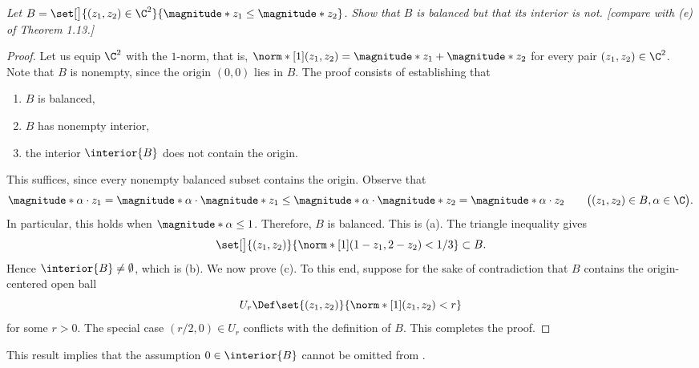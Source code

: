 % 
%
\textit{Let $B = \set[\big]{(z_1, z_2) \in \C^2}{\magnitude*{z_1} \leq \magnitude*{z_2}}$. Show that $B$ is balanced %
but that its interior is not. [compare with (e) of Theorem 1.13.]}
%
\begin{proof}
Let us equip $\C^2$ with the $1$-norm, that is, $\norm*[1]{(z_1, z_2)} = \magnitude*{z_1} + \magnitude*{z_2}$ for every pair %
$(z_1, z_2) \in \C^2$. Note that $B$ is nonempty, since the origin $(0, 0)$ lies in $B$. The proof consists of %
establishing that 
%
\begin{enumerate}[item-label=(\alph{enumi})]
  \item $B$ is balanced,
  \item $B$ has nonempty interior,
  \item the interior $\interior{B}$ does not contain the origin. 
\end{enumerate}
%
This suffices, since every nonempty balanced subset contains the origin. Observe that
%
\begin{equation}
  \magnitude*{\alpha \cdot z_1}  
  = \magnitude*{\alpha}\cdot \magnitude*{z_1} 
  \leq  \magnitude*{\alpha} \cdot \magnitude*{z_2} 
  = \magnitude*{\alpha \cdot z_2} %
  \qquad \bigl((z_1,z_2) \in B, \alpha \in \C \bigr).
\end{equation}
%
In particular, this holds when $\magnitude*{\alpha} \leq 1$. Therefore, $B$ is balanced. This is (a). The triangle inequality %
gives
%
\begin{equation}
   \set[\big]{(z_1, z_2)}{ \norm*[1]{(1- z_1, 2- z_2)} < 1/3} \subset B. 
\end{equation}
%
Hence $\interior{B}\neq \emptyset$, which is (b). We now prove (c). To this end, suppose for the sake of contradiction that %
$B$ contains the origin-centered open ball
%
\begin{equation}
  U_r \Def \set{(z_1, z_2)}{\norm*[1]{(z_1, z_2)} < r}
\end{equation}
%
for some $r> 0$. The special case $(r/2, 0)\in U_r$ conflicts with the definition of $B$. This completes the proof. 
\end{proof}
%
\par{} This result implies that the assumption $0\in \interior{B}$ cannot be omitted from %
.
% 

